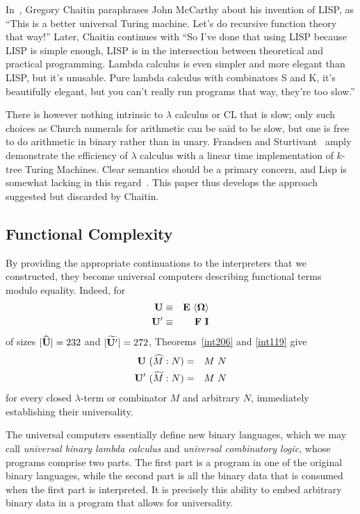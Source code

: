 \documentclass{article}
\newcommand{\tup}[1]{\langle #1 \rangle}
\newcommand{\pref}[2]{(#1:#2)}
\newcommand{\CI}{{\bf I}}
\newcommand{\CU}{{\bf U}}
\newcommand{\CE}{{\bf E}}
\newcommand{\CF}{{\bf F}}
\newcommand{\COm}{{\bf \Omega}}
\begin{document}
In~\cite{ch}, Gregory Chaitin paraphrases John McCarthy about his
invention of LISP,
as ``This is a better universal Turing machine.
Let's do recursive function theory that way!''
Later, Chaitin continues with ``So I've done that using LISP because LISP is
simple enough, LISP is in the intersection between
theoretical and practical programming.
Lambda calculus is even simpler and more elegant than LISP,
but it's unusable. Pure lambda calculus with combinators S and K,
it's beautifully elegant, but you
can't really run programs that way, they're too slow.''

There is however nothing intrinsic to $\lambda$ calculus or CL that is slow;
only such choices as Church numerals for arithmetic
can be said to be slow,
but one is free to do arithmetic in binary rather than in unary.
Frandsen and Sturtivant~\cite{fs} amply demonstrate the efficiency
of $\lambda$ calculus with a linear time implementation of $k$-tree
Turing Machines.
Clear semantics should be a primary concern, and Lisp is somewhat
lacking in this regard~\cite{mul}.
This paper thus develops the approach suggested but
discarded by Chaitin.

\subsection{Functional Complexity}

By providing the appropriate continuations to the
interpreters that we constructed, they become
universal computers describing functional terms modulo equality.
Indeed, for
\begin{eqnarray*}
\CU & \equiv & \CE\ \tup{\COm} \\
\CU' & \equiv & \CF\ \CI
\end{eqnarray*}
of sizes $|\widehat{\CU}|=232$ and $|\widetilde{\CU'}|=272$,
Theorems~\ref{int206} and \ref{int119} give
\begin{eqnarray*}
\CU\ \pref{\widehat{M}}{N} & = & M\ N \\
\CU'\ \pref{\widetilde{M}}{N} & = & M\ N
\end{eqnarray*}
for every closed $\lambda$-term or combinator $M$ and arbitrary $N$,
immediately establishing their universality.

The universal computers essentially define new binary languages,
which we may call {\em universal binary lambda calculus} and
{\em universal combinatory logic}, whose programs comprise two parts.
The first part is a program in one of the original binary languages,
while the second part is all the binary data that is consumed when
the first part is interpreted.
It is precisely this ability to embed
arbitrary binary data in a program that allows for universality.
\end{document}
